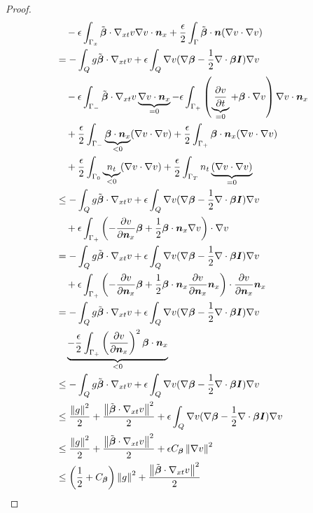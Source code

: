 \documentclass{article}
\begin{document}
\begin{proof}
\begin{align*}
&\quad-\epsilon\int_{\Gamma_x}\tilde\bfbeta\cdot\Gradxt v\Grad v\cdot\bfn_x
+\frac{\epsilon}{2}\int_\Gamma\tilde\bfbeta\cdot\bfn(\Grad v\cdot\Grad v)\\
%
&=-\int_Q g\tilde\bfbeta\cdot\Gradxt v
+\epsilon\int_Q\Grad v(\Grad\bfbeta-\frac{1}{2}\Div\bfbeta\bfI)\Grad v\\
&\quad
-\epsilon\int_{\Gamma_-}\tilde\bfbeta\cdot\Gradxt v\underbrace{\Grad v\cdot\bfn_x}_{=0}
-\epsilon\int_{\Gamma_+}\LRp{\underbrace{\pd{v}{t}}_{=0}+\bfbeta\cdot\Grad v}\Grad v\cdot\bfn_x\\
&\quad
+\frac{\epsilon}{2}\int_{\Gamma_-}\underbrace{\bfbeta\cdot\bfn_x}_{<0}(\Grad v\cdot\Grad v)
+\frac{\epsilon}{2}\int_{\Gamma_+}\bfbeta\cdot\bfn_x(\Grad v\cdot\Grad v)\\
&\quad
+\frac{\epsilon}{2}\int_{\Gamma_0}\underbrace{n_t}_{<0}(\Grad v\cdot\Grad v)
+\frac{\epsilon}{2}\int_{\Gamma_T}n_t\underbrace{(\Grad v\cdot\Grad v)}_{=0}\\
%
&\leq-\int_Q g\tilde\bfbeta\cdot\Gradxt v
+\epsilon\int_Q\Grad v(\Grad\bfbeta-\frac{1}{2}\Div\bfbeta\bfI)\Grad v\\
&\quad
+\epsilon\int_{\Gamma_+}\LRp{-\pd{v}{\bfn_x}\bfbeta
+\frac{1}{2}\bfbeta\cdot\bfn_x\Grad v}\cdot\Grad v\\
%
&=-\int_Q g\tilde\bfbeta\cdot\Gradxt v
+\epsilon\int_Q\Grad v(\Grad\bfbeta-\frac{1}{2}\Div\bfbeta\bfI)\Grad v\\
&\quad
+\epsilon\int_{\Gamma_+}\LRp{-\pd{v}{\bfn_x}\bfbeta
+\frac{1}{2}\bfbeta\cdot\bfn_x\pd{v}{\bfn_x}\bfn_x}\cdot\pd{v}{\bfn_x}\bfn_x\\
%
&=-\int_Q g\tilde\bfbeta\cdot\Gradxt v
+\epsilon\int_Q\Grad v(\Grad\bfbeta-\frac{1}{2}\Div\bfbeta\bfI)\Grad v\\
&\quad
\underbrace{-\frac{\epsilon}{2}\int_{\Gamma_+}\LRp{\pd{v}{\bfn_x}}^2\bfbeta\cdot\bfn_x}_{<0}\\
%
&\leq-\int_Q g\tilde\bfbeta\cdot\Gradxt v
+\epsilon\int_Q\Grad v(\Grad\bfbeta-\frac{1}{2}\Div\bfbeta\bfI)\Grad v\\
%
&\leq\frac{\norm{g}^2}{2}+\frac{\norm{\tilde\bfbeta\cdot\Gradxt v}^2}{2}
+\epsilon\int_Q\Grad v(\Grad\bfbeta-\frac{1}{2}\Div\bfbeta\bfI)\Grad v\\
%
&\leq\frac{\norm{g}^2}{2}+\frac{\norm{\tilde\bfbeta\cdot\Gradxt v}^2}{2}
+\epsilon C_{\bfbeta}\norm{\Grad v}^2\\
%
&\leq\LRp{\frac{1}{2}+C_{\bfbeta}}\norm{g}^2+\frac{\norm{\tilde\bfbeta\cdot\Gradxt v}^2}{2}
\end{align*}
\end{proof}
\end{document}
